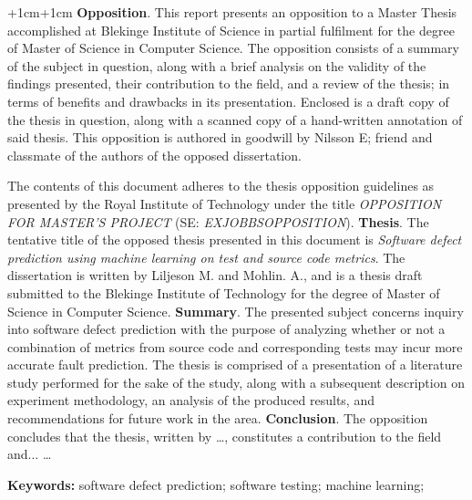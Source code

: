 
\abstract
\begin{changemargin}{+1cm}{+1cm}
\noindent
\textbf{Opposition}.
This report presents an opposition to a Master Thesis accomplished at Blekinge Institute of Science in partial fulfilment for the degree of Master of Science in Computer Science.
The opposition consists of a summary of the subject in question, along with a brief analysis on the validity of the findings presented, their contribution to the field, and a review of the thesis; in terms of benefits and drawbacks in its presentation.
Enclosed is a draft copy of the thesis in question, along with a scanned copy of a hand-written annotation of said thesis.
This opposition is authored in goodwill by Nilsson E; friend and classmate of the authors of the opposed dissertation.

The contents of this document adheres to the thesis opposition guidelines as presented by the Royal Institute of Technology under the title \textit{OPPOSITION FOR MASTER'S PROJECT} (SE: \textit{EXJOBBSOPPOSITION}).
\newline
\textbf{Thesis}. The tentative title of the opposed thesis presented in this document is \textit{Software defect prediction using machine learning on test and source code metrics}.
The dissertation is written by Liljeson M. and Mohlin. A., and is a thesis draft submitted to the Blekinge Institute of Technology for the degree of Master of Science in Computer Science.
\newline
\textbf{Summary}.
The presented subject concerns inquiry into software defect prediction with the purpose of analyzing whether or not a combination of metrics from source code and corresponding tests may incur more accurate fault prediction.
The thesis is comprised of a presentation of a literature study performed for the sake of the study, along with a subsequent description on experiment methodology, an analysis of the produced results, and recommendations for future work in the area.
\newline
\textbf{Conclusion}.
The opposition concludes that the thesis, written by \ldots, constitutes a contribution to the field and...
\ldots

\par\vspace {0.5cm}
\noindent
\textbf{Keywords:} software defect prediction; software testing; machine learning;

\end{changemargin}
